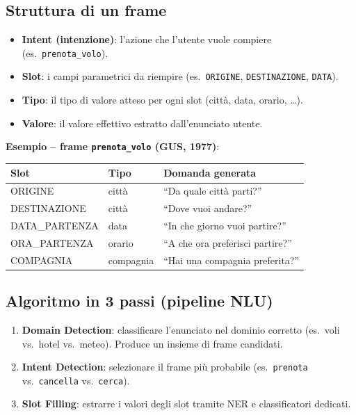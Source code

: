 \documentclass[12pt,a4paper]{article}
\begin{document}
\subsection{Struttura di un frame}

\begin{defbox}
\begin{itemize}[leftmargin=1.5em]
  \item \textbf{Intent (intenzione)}: l'azione che l'utente vuole compiere (es.\ \texttt{prenota\_volo}).
  \item \textbf{Slot}: i campi parametrici da riempire (es.\ \texttt{ORIGINE}, \texttt{DESTINAZIONE}, \texttt{DATA}).
  \item \textbf{Tipo}: il tipo di valore atteso per ogni slot (città, data, orario, \dots).
  \item \textbf{Valore}: il valore effettivo estratto dall'enunciato utente.
\end{itemize}
\end{defbox}

\textbf{Esempio -- frame \texttt{prenota\_volo} (GUS, 1977)}:
\begin{center}
\begin{tabular}{lll}
\toprule
\textbf{Slot} & \textbf{Tipo} & \textbf{Domanda generata} \\
\midrule
ORIGINE & città & ``Da quale città parti?'' \\
DESTINAZIONE & città & ``Dove vuoi andare?'' \\
DATA\_PARTENZA & data & ``In che giorno vuoi partire?'' \\
ORA\_PARTENZA & orario & ``A che ora preferisci partire?'' \\
COMPAGNIA & compagnia & ``Hai una compagnia preferita?'' \\
\bottomrule
\end{tabular}
\end{center}

\subsection{Algoritmo in 3 passi (pipeline NLU)}

\begin{enumerate}[leftmargin=1.5em, label=\arabic*.]
  \item \textbf{Domain Detection}: classificare l'enunciato nel dominio corretto (es.\ voli vs.\ hotel vs.\ meteo). Produce un insieme di frame candidati.
  \item \textbf{Intent Detection}: selezionare il frame più probabile (es.\ \texttt{prenota} vs.\ \texttt{cancella} vs.\ \texttt{cerca}).
  \item \textbf{Slot Filling}: estrarre i valori degli slot tramite NER e classificatori dedicati.
\end{enumerate}
\end{document}
